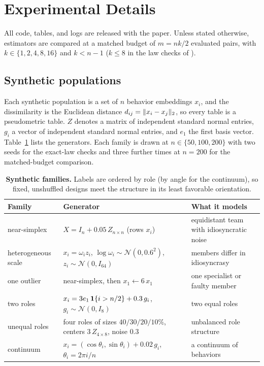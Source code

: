 \section{Experimental Details}
\label{app:exp-details}

All code, tables, and logs are released with the paper. Unless stated
otherwise, estimators are compared at a matched budget of $m=nk/2$ evaluated
pairs, with $k\in\{1,2,4,8,16\}$ and $k<n-1$ ($k\le8$ in the law checks of ).

\subsection{Synthetic populations}
\label{app:exp-details:synthetic}

Each synthetic population is a set of $n$ behavior embeddings $x_i$, and the
dissimilarity is the Euclidean distance $d_{ij}=\lVert x_i-x_j\rVert_2$, so every
table is a pseudometric table. $Z$ denotes a matrix of independent standard
normal entries, $g_i$ a vector of independent standard normal entries, and $e_1$ the first basis vector. Table~\ref{tab:synthetic}
lists the generators. Each family is drawn at $n\in\{50,100,200\}$ with two seeds for the exact-law checks and three further times at $n=200$ for the matched-budget comparison.

\begin{table}[ht]
\centering
\small
\caption{\textbf{Synthetic families.} Labels are ordered by role (by angle for the
continuum), so fixed, unshuffled designs meet the structure in its least
favorable orientation.}
\label{tab:synthetic}
\begin{tabular}{@{}>{\raggedright\arraybackslash}p{2.4cm}>{\raggedright\arraybackslash}p{6.9cm}>{\raggedright\arraybackslash}p{4.9cm}@{}}
\toprule
Family & Generator & What it models \\
\midrule
near-simplex & $X=I_n+0.05\,Z_{n\times n}$ (rows $x_i$) & equidistant team with idiosyncratic noise \\
heterogeneous scale & $x_i=\omega_i z_i$, $\log \omega_i\sim\mathcal N(0,0.6^2)$, $z_i\sim\mathcal N(0,I_{64})$ & members differ in idiosyncrasy \\
one outlier & near-simplex, then $x_1\leftarrow 6\,x_1$ & one specialist or faulty member \\
two roles & $x_i=3e_1\,\mathbf{1}\{i>n/2\}+0.3\,g_i$, $g_i\sim\mathcal N(0,I_8)$ & two equal roles \\
unequal roles & four roles of sizes $40/30/20/10\%$, centers $3\,Z_{4\times 8}$, noise $0.3$ & unbalanced role structure \\
continuum & $x_i=(\cos\theta_i,\sin\theta_i)+0.02\,g_i$, $\theta_i=2\pi i/n$ & a continuum of behaviors \\
\bottomrule
\end{tabular}
\end{table}

